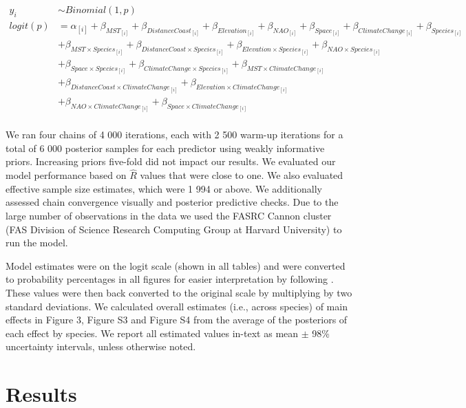 \documentclass{article}\usepackage[]{graphicx}\usepackage[]{color}
\begin{document}
\begin{align*}
 y_i & \sim Binomial(1,p) \tag{2} \\
logit(p) &= \alpha_{[i]} + \beta_{MST_{[i]}} + \beta_{DistanceCoast_{[i]}} + \beta_{Elevation_{[i]}} + \beta_{NAO_{[i]}} + \beta_{Space_{[i]}} + \beta_{ClimateChange_{[i]}} + \beta_{Species_{[i]}} \\ 
  &+ \beta_{MST \times Species_{[i]}} + \beta_{DistanceCoast \times Species_{[i]}} + \beta_{Elevation \times Species_{[i]}} + \beta_{NAO \times Species_{[i]}}\\
  &+ \beta_{Space \times Species_{[i]}} + \beta_{ClimateChange \times Species_{[i]}} + \beta_{MST \times ClimateChange_{[i]}}\\ 
  &+ \beta_{DistanceCoast \times ClimateChange_{[i]}} + \beta_{Elevation \times ClimateChange_{[i]}}\\ 
  &+ \beta_{NAO \times ClimateChange_{[i]}} + \beta_{Space \times ClimateChange_{[i]}} \nonumber\\
\end{align*}

We ran four chains of 4 000 iterations, each with 2 500 warm-up iterations for a total of 6 000 posterior samples for each predictor using weakly informative priors. Increasing priors five-fold did not impact our results. We evaluated our model performance based on $\hat{R}$ values that were close to one. We also evaluated effective sample size estimates, which were 1 994 or above. We additionally assessed chain convergence visually and posterior predictive checks. Due to the large number of observations in the data we used the FASRC Cannon cluster (FAS Division of Science Research Computing Group at Harvard University) to run the model. 

Model estimates were on the logit scale (shown in all tables) and were converted to probability percentages in all figures for easier interpretation by following \cite{Gelman2006}. These values were then back converted to the original scale by multiplying by two standard deviations. We calculated overall estimates (i.e., across species) of main effects in Figure 3, Figure S3 and Figure S4 from the average of the posteriors of each effect by species. We report all estimated values in-text as mean $\pm$ 98\% uncertainty intervals, unless otherwise noted. 

\section*{Results} %
\end{document}
